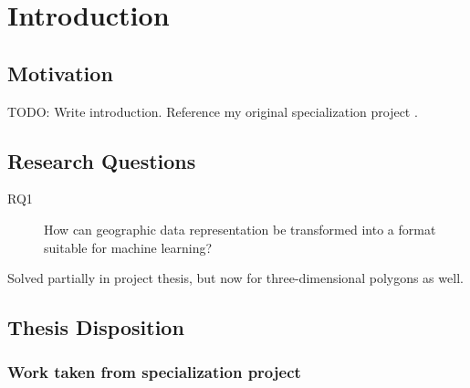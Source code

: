 \chapter{Introduction}%
\label{sec:introduction}

\section{Motivation}
TODO: Write introduction.
Reference my original specialization project \cite{specialization-project}.

\section{Research Questions}
\begin{description}
  \item[RQ1] How can geographic data representation be transformed into a format suitable for machine learning?
\end{description}

Solved partially in project thesis, but now for three-dimensional polygons as well.

\section{Thesis Disposition}

\subsection{Work taken from specialization project}

